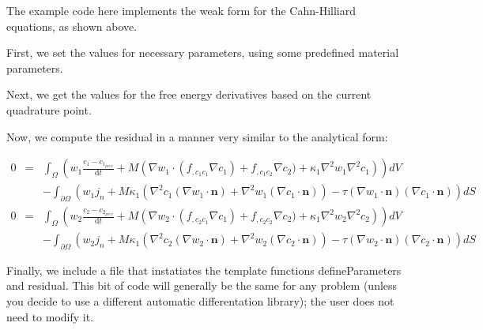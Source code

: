 The example code here implements the weak form for the Cahn-\/\-Hilliard equations, as shown above.

First, we set the values for necessary parameters, using some predefined material parameters.


\begin{DoxyCodeInclude}

\end{DoxyCodeInclude}


Next, we get the values for the free energy derivatives based on the current quadrature point.


\begin{DoxyCodeInclude}

\end{DoxyCodeInclude}


Now, we compute the residual in a manner very similar to the analytical form\-:

\begin{eqnarray*} 0 &=& \int_\Omega \left(w_1\frac{c_1 - c_{1_{prev}}}{\mathrm{d}t} + M\left(\nabla w_1\cdot(f_{,c_1c_1}\nabla c_1) + f_{,c_1c_2}\nabla c_2) + \kappa_1\nabla^2 w_1\nabla^2 c_1\right)\right) dV\\ &\phantom{=}& - \int_{\partial\Omega} \left(w_1j_n + M\kappa_1\left(\nabla^2c_1(\nabla w_1\cdot\boldsymbol{n}) + \nabla^2w_1(\nabla c_1\cdot\boldsymbol{n})\right) - \tau(\nabla w_1\cdot\boldsymbol{n})(\nabla c_1\cdot\boldsymbol{n})\right) dS\\ 0 &=& \int_\Omega \left(w_2\frac{c_2 - c_{2_{prev}}}{\mathrm{d}t} + M\left(\nabla w_2\cdot(f_{,c_2c_1}\nabla c_1) + f_{,c_2c_2}\nabla c_2) + \kappa_1\nabla^2 w_2\nabla^2 c_2\right)\right) dV\\ &\phantom{=}& - \int_{\partial\Omega} \left(w_2j_n + M\kappa_1\left(\nabla^2c_2(\nabla w_2\cdot\boldsymbol{n}) + \nabla^2w_2(\nabla c_2\cdot\boldsymbol{n})\right) - \tau(\nabla w_2\cdot\boldsymbol{n})(\nabla c_2\cdot\boldsymbol{n})\right) dS \end{eqnarray*}


\begin{DoxyCodeInclude}

\end{DoxyCodeInclude}


Finally, we include a file that instatiates the template functions {\ttfamily define\-Parameters} and {\ttfamily residual}. This bit of code will generally be the same for any problem (unless you decide to use a different automatic differentation library); the user does not need to modify it.



